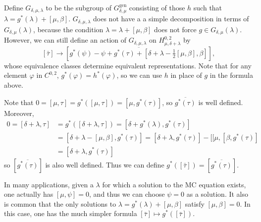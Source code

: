\documentclass[12pt]{amsart}
\theoremstyle{definition}
\begin{document}
Define ${\mbox{$G_{\delta,\mu,\lambda}$}}$ to be the subgroup of ${\mbox{$G^{\text{gen}}_{\delta,\mu}$}}$ consisting of
those $h$ such that $\lambda=g^*(\lambda)+[\mu,\beta]$.
${\mbox{$G_{\delta,\mu,\lambda}$}}$ does not have a a simple decomposition in terms of
${\mbox{${\mbox{$G_{\delta,\mu}$}}(\lambda)$}}$, because the condition $\lambda=\lambda+[\mu,\beta]$ does not
force $g\in{\mbox{${\mbox{$G_{\delta,\mu}$}}(\lambda)$}}$. However, we can still define an action of
${\mbox{$G_{\delta,\mu,\lambda}$}}$ on $H_{\mu,{\delta+\lambda}}^{0,2}$ by
$$[\bar\tau]{\rightarrow} [\overline{
g^*(\psi)-\psi+g^*(\tau)+[\delta+\lambda-\tfrac12[\mu,\beta],\beta]}],$$
whose equivalence classes determine equivalent representations. Note
that for any element ${\varphi}$ in $C^{0,2}$, $g^*({\varphi})=h^*({\varphi})$, so we
can use $h$ in place of $g$ in the formula above.

Note that $
0=[\mu,\tau]=g^*([\mu,\tau])=[\mu,g^*(\tau)]$,
so $\overline{g^*(\tau)}$ is well defined. Moreover,
\begin{align*}
0=[\delta+\lambda,\tau]&=g^*([\delta+\lambda,\tau])=
[\delta+g^*(\lambda),g^*(\tau)]\\&=
[\delta+\lambda-[\mu,\beta],g^*(\tau)]
=[\delta+\lambda,g^*(\tau)]-[[\mu,[\beta,g^*(\tau)]
\\&=[\delta+\lambda,g^*(\tau)]
\end{align*}
so $[\overline{g^*(\tau)}]$ is also well defined.
Thus we can define $g^*([\bar\tau])=[\overline{g^*(\tau)}]$.

In many applications, given a $\lambda$ for which a solution to the MC equation exists,
one actually has $[\mu,\psi]=0$, and thus we can choose $\psi=0$ as a solution. It also
is common that the only solutions to $\lambda=g^*(\lambda)+[\mu,\beta]$ satisfy
$[\mu,\beta]=0$. In this case, one has the much simpler formula
$[\bar\tau]\mapsto g^*([\bar\tau])$.
\end{document}
